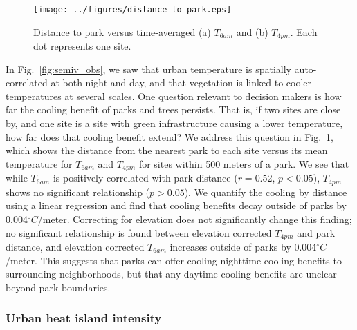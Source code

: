 \documentclass[draft,linenumbers]{agujournal}
\begin{document}
\begin{figure}
\centering
\texttt{[image: ../figures/distance\_to\_park.eps]}
\caption{Distance to park versus time-averaged (a) $T_{6am}$ and (b) $T_{4pm}$. Each dot represents one site.}
\label{fig:park_distance}
\end{figure}

In Fig.~\ref{fig:semiv_obs}, we saw that urban temperature is spatially auto-correlated at both night and day, and that vegetation is linked to cooler temperatures at several scales. One question relevant to decision makers is how far the cooling benefit of parks and trees persists. That is, if two sites are close by, and one site is a site with green infrastructure causing a lower temperature, how far does that cooling benefit extend? 
We address this question in Fig.~\ref{fig:park_distance}, which shows the distance from the nearest park to each site versus its mean temperature for $T_{6am}$ and $T_{4pm}$ for sites within 500 meters of a park. We see that while $T_{6am}$ is positively correlated with park distance ($r=0.52$, $p< 0.05$), $T_{4pm}$ shows no significant relationship ($p>0.05$).  We quantify the cooling by distance using a linear regression and find that cooling benefits decay outside of parks by 0.004$^\circ C$/meter. 
Correcting for elevation does not significantly change this finding; no significant relationship is found between elevation corrected $T_{4pm}$ and park distance, and elevation corrected $T_{6am}$ increases outside of parks by 0.004$^\circ C$/meter.  This suggests that parks can offer cooling nighttime cooling benefits to surrounding neighborhoods, but that any daytime cooling benefits are unclear beyond park boundaries. 

\subsubsection{Urban heat island intensity}
\end{document}
